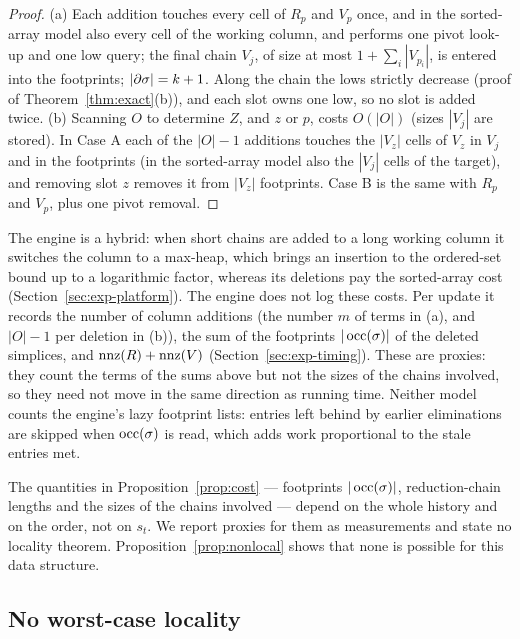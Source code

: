 \begin{proof}
(a) Each addition touches every cell of $R_p$ and $V_p$ once, and in the
sorted-array model also every cell of the working column, and performs one
pivot look-up and one low query; the final chain $V_j$, of size at most
$1+\sum_i|V_{p_i}|$, is entered into the footprints; $|\partial\sigma|=k+1$. Along
the chain the lows strictly decrease (proof of Theorem~\ref{thm:exact}(b)), and
each slot owns one low, so no slot is added twice.
(b) Scanning $O$ to determine $Z$, and $z$ or $p$, costs $O(|O|)$ (sizes $|V_j|$
are stored). In Case A each of the $|O|-1$ additions touches the $|V_z|$ cells of
$V_z$ in $V_j$ and in the footprints (in the sorted-array model also the
$|V_j|$ cells of the target), and removing slot $z$ removes it from $|V_z|$
footprints. Case B is the same with $R_p$ and $V_p$, plus one pivot removal.
\end{proof}

The engine is a hybrid: when short chains are added to a long working column it
switches the column to a max-heap, which brings an insertion to the
ordered-set bound up to a logarithmic factor, whereas its deletions pay the
sorted-array cost (Section~\ref{sec:exp-platform}). The engine does not log
these costs. Per update it records the number of column additions (the number
$m$ of terms in (a), and $|O|-1$ per deletion in (b)), the sum of the
footprints $|\operatorname{occ}(\sigma)|$ of the deleted simplices, and $\operatorname{nnz}(R)+\operatorname{nnz}(V)$
(Section~\ref{sec:exp-timing}). These are proxies: they count the terms of the
sums above but not the sizes of the chains involved, so they need not move in
the same direction as running time. Neither model counts the engine's lazy
footprint lists: entries left behind by earlier eliminations are skipped when
$\operatorname{occ}(\sigma)$ is read, which adds work proportional to the stale entries met.

The quantities in Proposition~\ref{prop:cost} --- footprints $|\operatorname{occ}(\sigma)|$,
reduction-chain lengths and the sizes of the chains involved --- depend on the
whole history and on the order, not on $s_t$. We report proxies for them as
measurements and state no locality theorem. Proposition~\ref{prop:nonlocal}
shows that none is possible for this data structure.

\subsection{No worst-case locality}\label{sec:nonlocal}

